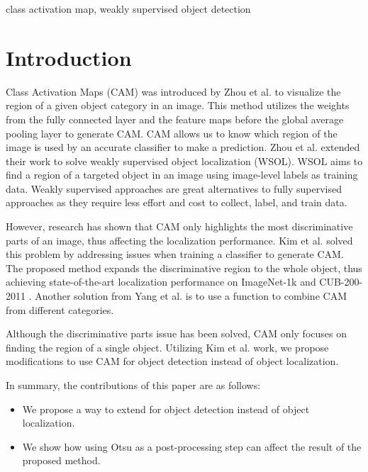 \documentclass[conference]{IEEEtran}
\begin{document}
\begin{IEEEkeywords}
    class activation map, weakly supervised object detection
\end{IEEEkeywords}

\section{Introduction}
Class Activation Maps (CAM) was introduced by Zhou et al. \cite{zhou2015cnnlocalization} to visualize the region of a given object category in an image. This method utilizes the weights from the fully connected layer and the feature maps before the global average pooling layer to generate CAM. CAM allows us to know which region of the image is used by an accurate classifier to make a prediction. Zhou et al. extended their work to solve weakly supervised object localization (WSOL). WSOL aims to find a region of a targeted object in an image using image-level labels as training data. Weakly supervised approaches are great alternatives to fully supervised approaches \cite{Jocher_YOLO_by_Ultralytics_2023} \cite{ren2015faster} as they require less effort and cost to collect, label, and train data.

However, research has shown that CAM only highlights the most discriminative parts of an image, thus affecting the localization performance. Kim et al. \cite{kim2022bridging} solved this problem by addressing issues when training a classifier to generate CAM. The proposed method expands the discriminative region to the whole object, thus achieving state-of-the-art localization performance on ImageNet-1k \cite{ILSVRC15} and CUB-200-2011 \cite{WahCUB_200_2011}. Another solution from Yang et al. \cite{yang2019combinational} is to use a function to combine CAM from different categories.

Although the discriminative parts issue has been solved, CAM only focuses on finding the region of a single object. Utilizing Kim et al. \cite{kim2022bridging} work, we propose modifications to use CAM for object detection instead of object localization.

In summary, the contributions of this paper are as follows:
\begin{itemize}
    \item We propose a way to extend \cite{kim2022bridging} for object detection instead of object localization.
    \item We show how using Otsu as a post-processing step can affect the result of the proposed method.
\end{itemize}
\end{document}
